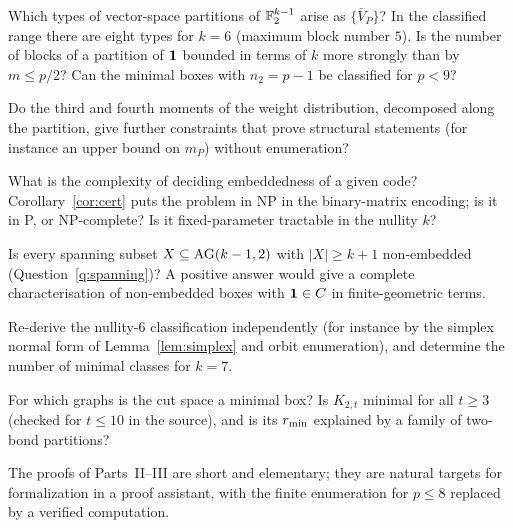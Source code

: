 \begin{question}\label{q:types}
Which types of vector-space partitions of $\mathbb F_2^{k-1}$ arise as $\{\bar V_P\}$? In the classified range there are eight types for $k=6$ (maximum block number $5$). Is the number of blocks of a partition of $\mathbf 1$ bounded in terms of $k$ more strongly than by $m\le p/2$? Can the minimal boxes with $n_2=p-1$ be classified for $p<9$?
\end{question}

\begin{question}\label{q:moments}
Do the third and fourth moments of the weight distribution, decomposed along the partition, give further constraints that prove structural statements (for instance an upper bound on $m_P$) without enumeration?
\end{question}

\begin{question}\label{q:algo}
What is the complexity of deciding embeddedness of a given code? Corollary~\ref{cor:cert} puts the problem in NP in the binary-matrix encoding; is it in P, or NP-complete? Is it fixed-parameter tractable in the nullity $k$?
\end{question}

\begin{question}\label{q:spanning2}
Is every spanning subset $X\subseteq\mathrm{AG}(k-1,2)$ with $|X|\ge k+1$ non-embedded (Question~\ref{q:spanning})? A positive answer would give a complete characterisation of non-embedded boxes with $\mathbf 1\in C$ in finite-geometric terms.
\end{question}

\begin{question}[Classification beyond $k=6$]\label{q:class7}
Re-derive the nullity-$6$ classification independently (for instance by the simplex normal form of Lemma~\ref{lem:simplex} and orbit enumeration), and determine the number of minimal classes for $k=7$.
\end{question}

\begin{question}\label{q:cutspaces}
For which graphs is the cut space a minimal box? Is $K_{2,t}$ minimal for all $t\ge3$ (checked for $t\le10$ in the source), and is its $r_{\min}$ explained by a family of two-bond partitions?
\end{question}

\begin{question}\label{q:formal}
The proofs of Parts~II--III are short and elementary; they are natural targets for formalization in a proof assistant, with the finite enumeration for $p\le8$ replaced by a verified computation.
\end{question}
